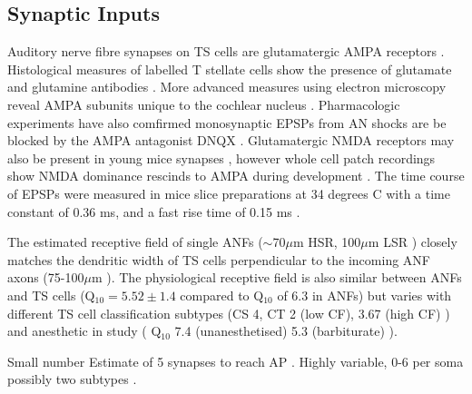 \subsection{Synaptic Inputs}

Auditory nerve fibre synapses on TS cells are glutamatergic AMPA receptors \citep{FerragamoGoldingEtAl:1998a,WentholdHunterEtAl:1993}.
Histological measures of labelled T stellate cells show the presence of glutamate and glutamine antibodies \citep{HackneyOsenEtAl:1990,WentholdHunterEtAl:1993}. 
More advanced measures using electron microscopy reveal AMPA subunits unique to the cochlear nucleus \citep{WangWentholdEtAl:1998}.
Pharmacologic experiments have also comfirmed monosynaptic EPSPs from AN shocks are be blocked by the AMPA antagonist DNQX \citep{FerragamoGoldingEtAl:1998a}.
Glutamatergic NMDA receptors may also be present in young mice synapses \citep{FerragamoGoldingEtAl:1998a}, however whole cell patch recordings show NMDA dominance rescinds to AMPA during development \citep{BellinghamLimEtAl:1998}.
The time course of EPSPs were measured in mice slice preparations at 34 degrees C with a time constant of 0.36 ms, and a fast rise time of 0.15 ms  \citep{GardnerTrussellEtAl:2001,Gardner:2000,GardnerTrussellEtAl:1999}.

The estimated receptive field of single ANFs ($\sim$70$\mu$m HSR, 100$\mu$m LSR  \citep{OertelWuEtAl:1990,Ryugo:2008,MeltzerRyugo:2006,RyugoParks:2003,Ryugo:1992,BrownBerglundEtAl:1988,RoullierCronin-SchreiberEtAl:1986,FeketeRouillerEtAl:1984}) closely matches the dendritic width of TS cells perpendicular to the incoming ANF axons  (75-100$\mu$m \citep[Mouse]{OertelWuEtAl:1990}). 
The physiological receptive field is also similar between ANFs and TS cells (Q$_{10}=5.52\pm1.4$  \citep[guinea pig]{JiangPalmerEtAl:1996} compared to Q$_{10}$ of 6.3 in ANFs) but varies with different TS cell classification subtypes (CS  4, CT  2 (low CF), 3.67 (high CF)  \citep[guinea pig]{PalmerWallaceEtAl:2003}) and anesthetic in study (%
Q$_{10}$ 7.4 (unanesthetised) 5.3 (barbiturate) \citep[cat][]{RhodeKettner:1987}).                      

Small number \citep{Cant:1981,FayPopper:1994,ReddCahillEtAl:2002,RyugoWrigthEtAl:1993,Ryugo:1992,RyugoParks:2003}
Estimate of 5 synapses to reach AP \citep[Mouse][]{FerragamoGoldingEtAl:1998a}. 
Highly variable, 0-6 per soma possibly two subtypes \citep[Chinchilla][]{JosephsonMorest:1998}.

